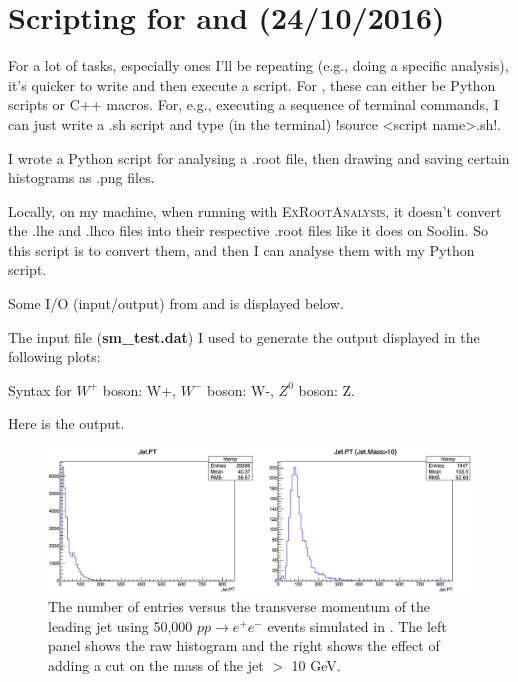 \newpage
\chapter{Scripting for \madgraph and \ROOT (24/10/2016)}

For a lot of tasks, especially ones I'll be repeating (e.g., doing a specific analysis), it's quicker to write and then execute a script. For \ROOT, these can either be Python scripts or C++ macros. For, e.g., executing a sequence of terminal commands, I can just write a .sh script and type (in the terminal) !source <script name>.sh!.

I wrote a Python script for analysing a .root file, then drawing and saving certain histograms as .png files.



Locally, on my machine, when running \madgraph with \textsc{ExRootAnalysis}, it doesn't convert the .lhe and .lhco files into their respective .root files like it does on Soolin. So this script is to convert them, and then I can analyse them with my Python script.



Some I/O (input/output) from \madgraph and \ROOT is displayed below.

The input file (\textbf{sm\_test.dat}) I used to generate the output displayed in the following plots:



Syntax for $W^+$ boson: W+, $W^-$ boson: W-, $Z^0$ boson: Z.

Here is the output.

\begin{figure}[H]
\centering
\includegraphics[width=\textwidth]{./sec10/JetPT.png}
\caption{The number of entries versus the transverse momentum of the leading jet using 50,000 $pp \rightarrow e^+ e^-$ events simulated in \madgraph. The left panel shows the raw histogram and the right shows the effect of adding a cut on the mass of the jet $>$ 10 GeV.}
\end{figure}

